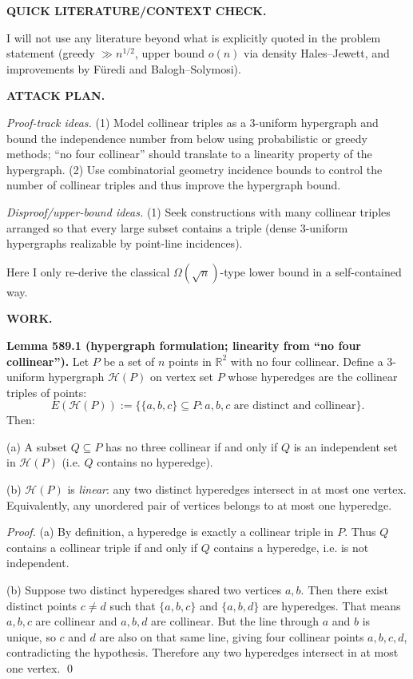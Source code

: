 \bigskip
\noindent\textbf{QUICK LITERATURE/CONTEXT CHECK.}

I will not use any literature beyond what is explicitly quoted in the problem statement (greedy $\gg n^{1/2}$, upper bound $o(n)$ via density Hales--Jewett, and improvements by F\"uredi and Balogh--Solymosi).

\bigskip
\noindent\textbf{ATTACK PLAN.}

\emph{Proof-track ideas.}
(1) Model collinear triples as a 3-uniform hypergraph and bound the independence number from below using probabilistic or greedy methods; ``no four collinear'' should translate to a linearity property of the hypergraph.
(2) Use combinatorial geometry incidence bounds to control the number of collinear triples and thus improve the hypergraph bound.

\emph{Disproof/upper-bound ideas.}
(1) Seek constructions with many collinear triples arranged so that every large subset contains a triple (dense 3-uniform hypergraphs realizable by point-line incidences).

Here I only re-derive the classical $\Omega(\sqrt n)$-type lower bound in a self-contained way.

\bigskip
\noindent\textbf{WORK.}

\noindent\textbf{Lemma 589.1 (hypergraph formulation; linearity from ``no four collinear'').}
Let $P$ be a set of $n$ points in $\mathbb{R}^2$ with no four collinear.
Define a 3-uniform hypergraph $\mathcal{H}(P)$ on vertex set $P$ whose hyperedges are the collinear triples of points:
\[
E(\mathcal{H}(P)):=\{\{a,b,c\}\subseteq P: a,b,c \text{ are distinct and collinear}\}.
\]
Then:

(a) A subset $Q\subseteq P$ has no three collinear if and only if $Q$ is an independent set in $\mathcal{H}(P)$ (i.e. $Q$ contains no hyperedge).

(b) $\mathcal{H}(P)$ is \emph{linear}: any two distinct hyperedges intersect in at most one vertex.
Equivalently, any unordered pair of vertices belongs to at most one hyperedge.

\noindent\emph{Proof.}
(a) By definition, a hyperedge is exactly a collinear triple in $P$.
Thus $Q$ contains a collinear triple if and only if $Q$ contains a hyperedge, i.e. is not independent.

(b) Suppose two distinct hyperedges shared two vertices $a,b$.
Then there exist distinct points $c\ne d$ such that $\{a,b,c\}$ and $\{a,b,d\}$ are hyperedges.
That means $a,b,c$ are collinear and $a,b,d$ are collinear.
But the line through $a$ and $b$ is unique, so $c$ and $d$ are also on that same line, giving four collinear points $a,b,c,d$, contradicting the hypothesis.
Therefore any two hyperedges intersect in at most one vertex.
\qed


